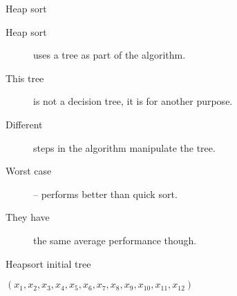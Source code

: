 \begin{frame}{Heap sort}
  \begin{description}
    \item[Heap sort] uses a tree as part of the algorithm.
    \vspace{4mm}
    \item[This tree] is not a decision tree, it is for another purpose.
    \vspace{4mm}
    \item[Different] steps in the algorithm manipulate the tree.
    \vspace{4mm}
    \item[Worst case] -- performs better than quick sort.
    \vspace{4mm}
    \item[They have] the same average performance though.
  \end{description}
\end{frame}

\begin{frame}[fragile]{Heapsort initial tree}
  \begin{center}
    $(x_1,x_2,x_3,x_4,x_5,x_6,x_7,x_8,x_9,x_{10},x_{11},x_{12})$ \\[1cm]
  \end{center}
\end{frame}


